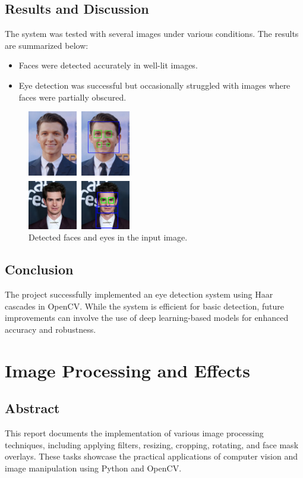 \documentclass{report}
\begin{document}
\section{Results and Discussion}
The system was tested with several images under various conditions. The results are summarized below:
\begin{itemize}
    \item Faces were detected accurately in well-lit images.
    \item Eye detection was successful but occasionally struggled with images where faces were partially obscured.
\end{itemize}

\begin{figure}[h!]
    \centering
    \includegraphics[width=0.4\textwidth]{images/Exp-1-Results.png} %
    \caption{Detected faces and eyes in the input image.}
    \label{fig:output}
\end{figure}

\section{Conclusion}
The project successfully implemented an eye detection system using Haar cascades in OpenCV. While the system is efficient for basic detection, future improvements can involve the use of deep learning-based models for enhanced accuracy and robustness.

\chapter{Image Processing and Effects} %

\section{Abstract}
This report documents the implementation of various image processing techniques, including applying filters, resizing, cropping, rotating, and face mask overlays. These tasks showcase the practical applications of computer vision and image manipulation using Python and OpenCV.
\end{document}
